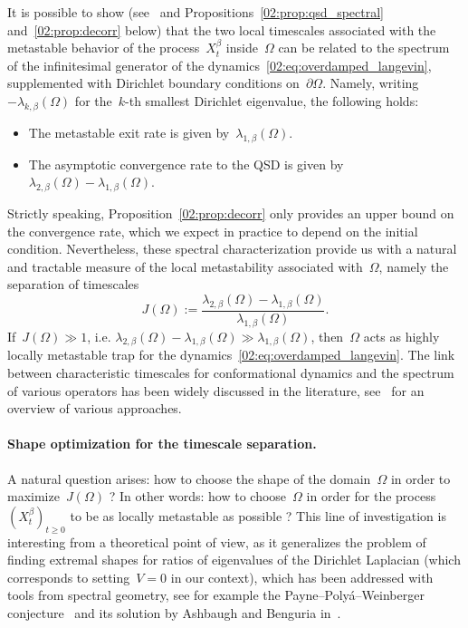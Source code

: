     It is possible to show (see~\cite{LBLLP12} and Propositions~\ref{02:prop:qsd_spectral} and~\ref{02:prop:decorr} below) that the two local timescales associated with the metastable behavior of the process~$X^\beta_t$ inside~$\Omega$ can be related to the spectrum of the infinitesimal generator of the dynamics~\eqref{02:eq:overdamped_langevin}, supplemented with Dirichlet boundary conditions on~$\partial \Omega$.
    Namely, writing~$-\lambda_{k,\beta}(\Omega)$ for the~$k$-th smallest Dirichlet eigenvalue, the following holds:
    \begin{itemize}
        \item{The metastable exit rate is given by~$\lambda_{1,\beta}(\Omega)$.}
        \item{The asymptotic convergence rate to the QSD is given by~$\lambda_{2,\beta}(\Omega)-\lambda_{1,\beta}(\Omega)$.}
    \end{itemize}
    Strictly speaking, Proposition~\ref{02:prop:decorr} only provides an upper bound on the convergence rate, which we expect in practice to depend on the initial condition. Nevertheless, these spectral characterization provide us with a natural and tractable measure of the local metastability associated with~$\Omega$, namely the separation of timescales
    \begin{equation}
        \label{02:eq:separation}
        J(\Omega) := \frac{\lambda_{2,\beta}(\Omega)-\lambda_{1,\beta}(\Omega)}{\lambda_{1,\beta}(\Omega)}.
    \end{equation}
    If~$J(\Omega)\gg 1$, i.e. $\lambda_{2,\beta}(\Omega)-\lambda_{1,\beta}(\Omega)\gg \lambda_{1,\beta}(\Omega)$, then~$\Omega$ acts as highly locally metastable trap for the dynamics~\eqref{02:eq:overdamped_langevin}.
    The link between characteristic timescales for conformational dynamics and the spectrum of various operators has been widely discussed in the literature, see~\cite{HS06,NN13,HKN04} for an overview of various approaches.
    
    \paragraph{Shape optimization for the timescale separation.}
    A natural question arises: how to choose the shape of the domain~$\Omega$ in order to maximize~$J(\Omega)$ ? In other words: how to choose~$\Omega$ in order for the process~$(X_t^\beta)_{t\geq 0}$ to be as locally metastable as possible ?
    This line of investigation is interesting from a theoretical point of view, as it generalizes the problem of finding extremal shapes for ratios of eigenvalues of the Dirichlet Laplacian (which corresponds to setting~$V=0$ in our context), which has been addressed with tools from spectral geometry, see for example the Payne--Poly\'a--Weinberger conjecture~\cite{PPW56} and its solution by Ashbaugh and Benguria in~\cite{AB92}.
    
